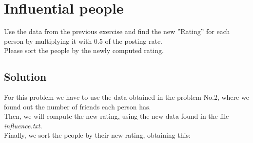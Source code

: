 \documentclass{article}
\begin{document}

    \section{Influential people}
    Use the data from the previous exercise and find the new ”Rating” for each
    person by multiplying it with 0.5 of the posting rate.\\
    Please sort the people by the newly computed rating.\\

    \vspace{3em}

    \subsection{Solution}
      For this problem we have to use the data obtained in the problem No.2,
      where we found out the number of friends each person has.\\
      Then, we will compute the new rating, using the new data found in the
      file \emph{influence.txt}.\\
      Finally, we sort the people by their new rating, obtaining this:\\

      \vspace{2em}
\end{document}
